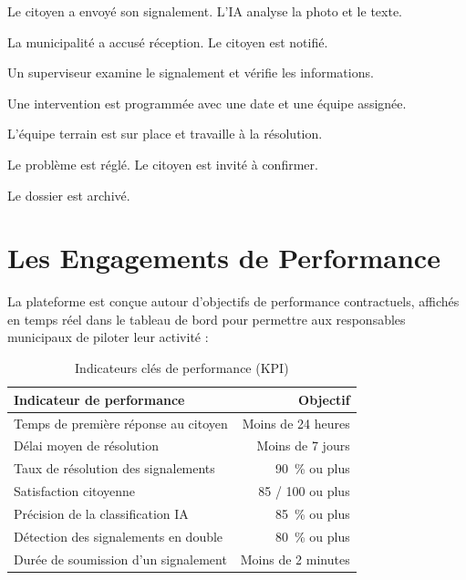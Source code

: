 \documentclass[12pt, a4paper]{article}
\begin{document}
\vspace{0.5cm}

\begin{description}[leftmargin=*, style=nextline]
  \item[\color{primary}Soumis] Le citoyen a envoyé son signalement. L'IA analyse la photo et le texte.
  \item[\color{primary}Reçu] La municipalité a accusé réception. Le citoyen est notifié.
  \item[\color{primary}En révision] Un superviseur examine le signalement et vérifie les informations.
  \item[\color{primary}Planifié] Une intervention est programmée avec une date et une équipe assignée.
  \item[\color{primary}En cours] L'équipe terrain est sur place et travaille à la résolution.
  \item[\color{primary}Résolu] Le problème est réglé. Le citoyen est invité à confirmer.
  \item[\color{primary}Fermé] Le dossier est archivé.
\end{description}

\section{Les Engagements de Performance}

La plateforme est conçue autour d'objectifs de performance contractuels, affichés en temps réel dans le tableau de bord pour permettre aux responsables municipaux de piloter leur activité :

\begin{table}[h!]
\centering
\begin{tabularx}{\textwidth}{Xr}
\toprule
\textbf{Indicateur de performance} & \textbf{Objectif} \\
\midrule
Temps de première réponse au citoyen   & Moins de 24 heures \\
Délai moyen de résolution              & Moins de 7 jours \\
Taux de résolution des signalements    & 90~\% ou plus \\
Satisfaction citoyenne                 & 85 / 100 ou plus \\
Précision de la classification IA      & 85~\% ou plus \\
Détection des signalements en double   & 80~\% ou plus \\
Durée de soumission d'un signalement   & Moins de 2 minutes \\
\bottomrule
\end{tabularx}
\caption{Indicateurs clés de performance (KPI)}
\end{table}
\end{document}

